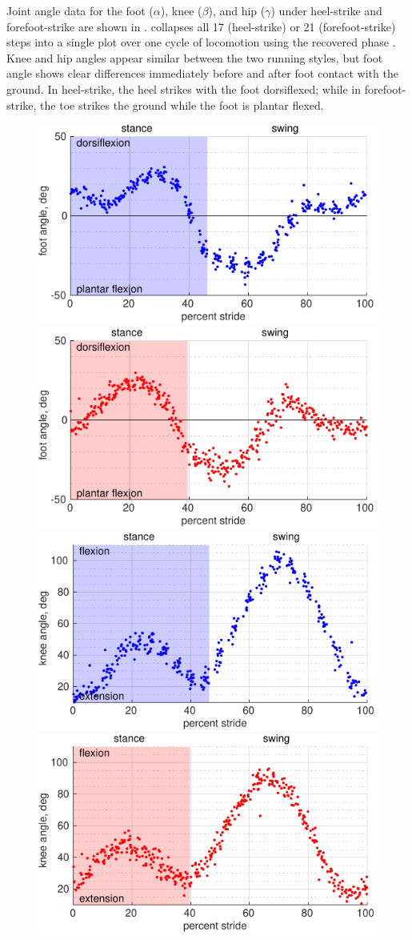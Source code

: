 Joint angle data for the foot ($\alpha$), knee ($\beta$), and hip ($\gamma$) under heel-strike and forefoot-strike are shown in .  collapses all 17 (heel-strike) or 21 (forefoot-strike) steps into a single plot over one cycle of locomotion using the recovered phase \citep{revzen2008estimating}. Knee and hip angles appear similar between the two running styles, but foot angle shows clear differences immediately before and after foot contact with the ground. In heel-strike, the heel strikes with the foot dorsiflexed; while in forefoot-strike, the toe strikes the ground while the foot is plantar flexed.
\begin{figure}
\begin{center}
\includegraphics[width=0.49\columnwidth]{data/heel-foot-angle.pdf}
\includegraphics[width=0.49\columnwidth]{data/toe-foot-angle.pdf}\\
\includegraphics[width=0.49\columnwidth]{data/heel-knee-angle.pdf}
\includegraphics[width=0.49\columnwidth]{data/toe-knee-angle.pdf}\\

\end{center}
\end{figure}
